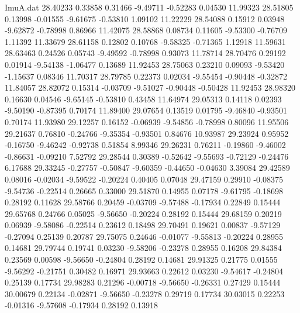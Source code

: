 \begin{filecontents}{ImuA.dat}
  28.40233    0.33858    0.31466   -9.49711   -0.52283    0.04530   11.99323
  28.51805    0.13998   -0.01555   -9.61675   -0.53810    1.09102   11.22229
  28.54088    0.15912    0.03948   -9.62872   -0.78998    0.86966   11.42075
  28.58868    0.08734    0.11605   -9.53300   -0.76709    1.11392   11.33679
  28.61158    0.12802    0.10768   -9.58325   -0.71365    1.12918   11.59631
  28.63463    0.24526    0.05743   -9.49592   -0.78998    0.93073   11.78714
  28.70476    0.29192    0.01914   -9.54138   -1.06477    0.13689   11.92453
  28.75063    0.23210    0.09093   -9.53420   -1.15637    0.08346   11.70317
  28.79785    0.22373    0.02034   -9.55454   -0.90448   -0.32872   11.84057
  28.82072    0.15314   -0.03709   -9.51027   -0.90448   -0.50428   11.92453
  28.98320    0.16630    0.04546   -9.65145   -0.53810    0.43458   11.64974
  29.05313    0.14118    0.02393   -9.50190   -0.87395    0.70174   11.89400
  29.07654    0.13519    0.01795   -9.46840   -0.93501    0.70174   11.93980
  29.12257    0.16152   -0.06939   -9.54856   -0.78998    0.80096   11.95506
  29.21637    0.76810   -0.24766   -9.35354   -0.93501    0.84676   10.93987
  29.23924    0.95952   -0.16750   -9.46242   -0.92738    0.51854    8.99346
  29.26231    0.76211   -0.19860   -9.46002   -0.86631   -0.09210    7.52792
  29.28544    0.30389   -0.52642   -9.55693   -0.72129   -0.24476    6.17688
  29.33245   -0.27757   -0.50847   -9.60359   -0.44650   -0.04630    3.39084
  29.42589    0.08016   -0.02034   -9.59522   -0.20224    0.40405    0.07048
  29.47159    0.29910   -0.08375   -9.54736   -0.22514    0.26665    0.33000
  29.51870    0.14955    0.07178   -9.61795   -0.18698    0.28192    0.11628
  29.58766    0.20459   -0.03709   -9.57488   -0.17934    0.22849    0.15444
  29.65768    0.24766    0.05025   -9.56650   -0.20224    0.28192    0.15444
  29.68159    0.20219    0.06939   -9.58086   -0.22514    0.23612    0.18498
  29.70491    0.19621    0.00837   -9.57129   -0.27094    0.25139    0.20787
  29.75075    0.24646   -0.01077   -9.55813   -0.20224    0.28955    0.14681
  29.79744    0.19741    0.03230   -9.58206   -0.23278    0.28955    0.16208
  29.84384    0.23569    0.00598   -9.56650   -0.24804    0.28192    0.14681
  29.91325    0.21775    0.01555   -9.56292   -0.21751    0.30482    0.16971
  29.93663    0.22612    0.03230   -9.54617   -0.24804    0.25139    0.17734
  29.98283    0.21296   -0.00718   -9.56650   -0.26331    0.27429    0.15444
  30.00679    0.22134   -0.02871   -9.56650   -0.23278    0.29719    0.17734
  30.03015    0.22253   -0.01316   -9.57608   -0.17934    0.28192    0.13918

\end{filecontents}
